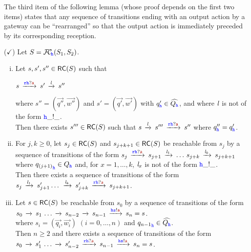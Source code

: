 \medskip
The third item of the following lemma (whose proof depends on the first two items)
states that any sequence of transitions ending with an output action by a gateway
can be ``rearranged'' so that the output action is immediately preceded
by its corresponding reception. 


\begin{lemma}($\checkmark$)
\label{lem:swap-rolf}
Let $S ={\mathcal{F}\!\mathcal{C}}_{\!{\mathtt{\color{blue}{ {h}}}}}(S_1,S_2)$.

\begin{enumerate}[i)]
\item\label{lem:swap-rolf-item1}
Let $s,s',s''\in \mathsf{RC}(S)$  such that\\
\centerline{
$s\lts{\ttr\HH?\msg[a]}s'\lts{\elle}s''$}
 where $s'' = (\vec{q''},\vec{w''})$ and $s' = (\vec{q'},\vec{w'})$ with  $q'_{\mathtt{\color{blue}{ {h}}}}\in \widehat{Q_{\mathtt{\color{blue}{ {h}}}}}$, and where $\mathit{l}$ is not of the form ${\mathtt{\color{blue}{ {h}}}}\_!\_$.\\
Then there exists $s'''\in \mathsf{RC}(S)$ such that $s\lts{\elle}s'''\lts{\ttr\HH?\msg[a]}s''$
where $q''_{\mathtt{\color{blue}{ {h}}}} = q'_{\mathtt{\color{blue}{ {h}}}}$.

\item\label{lem:swap-rolf-item2}
For $j,k \geq 0$, let $s_j \in \mathsf{RC}(S)$ and $s_{j+k+1} \in \mathsf{RC}(S)$ be reachable from $s_j$ by a sequence of transitions of the form
$s_j  \lts{\ttr\HH?\msg[a]} s_{j+1}\lts{\elle_1}\ldots\, s_{j+k}\lts{\elle_{k}}s_{j+k+1}$
 where ${q_{(j+1)}}_{\mathtt{\color{blue}{ {h}}}}\in Q_{\mathtt{\color{blue}{ {h}}}}$ and, for $x = 1,\ldots,k$,  $\mathit{l}_x$ is not of the form ${\mathtt{\color{blue}{ {h}}}}\_!\_$.\\
Then  there exists a sequence of transitions of the form
\\
\hspace*{30mm}
$s_j  \lts{\elle_1}s'_{j+1} \ldots\,  \lts{\elle_k} s'_{j+k} \lts{\ttr\HH?\msg[a]}s_{j+k+1}$.

\item\label{lem:swap-rolf-item3}
Let $s \in \mathsf{RC}(S)$ be reachable from $s_0$ by a sequence of
transitions of the form\\
\hspace*{30mm}
$s_0\lts{}  s_1\,\ldots \lts{} s_{n-2}  \lts{} s_{n-1}\lts{\HH\tts!\msg[a]}s_n=s$.\\
where $s_i = (\vec{q_i},\vec{w_i})$ $(i=0,\ldots,n)$ and ${q_{n-1}}_{\mathtt{\color{blue}{ {h}}}} \in \widehat{Q_{\mathtt{\color{blue}{ {h}}}}}$.\\
Then $n \geq 2$ and there exists a sequence of transitions of the form
\\
\hspace*{30mm}
$s_0\lts{} s'_1\,\ldots \lts{} s'_{n-2}\lts{\ttr\HH?\msg[a]}s_{n-1}\lts{\HH\tts!\msg[a]}s_n=s$.
\end{enumerate}
\end{lemma}

